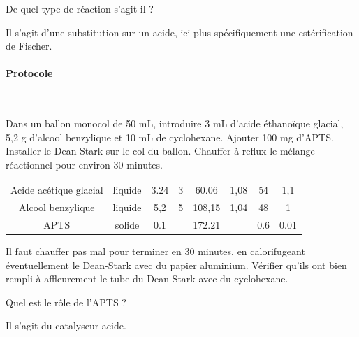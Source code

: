 \documentclass[twoside,a4paper,11pt,answers]{exam}
\begin{document}
\begin{questions}
\begin{framed}
\question De quel type de réaction s'agit-il ?
\begin{solution}[2cm]
Il s'agit d'une substitution sur un acide, ici plus spécifiquement une estérification de Fischer.
\end{solution}
\end{framed}


\paragraph*{Protocole}

~

Dans un ballon monocol de 50 mL, introduire 3 mL d’acide éthanoïque glacial, 5,2 g d’alcool benzylique et 10 mL de cyclohexane. Ajouter 100 mg d’APTS. Installer le Dean-Stark sur le col du ballon. Chauffer à reflux le mélange réactionnel pour environ 30 minutes.

\begin{solution}

\begin{tabular}{c|c|c|c|c|c|c|c}
\toprule
    \hline
     Acide acétique glacial  & liquide & 3.24 & 3 &	60.06	& 1,08	& 54	& 1,1 \\
Alcool benzylique & liquide	& 5,2	& 5	& 108,15	& 1,04 & 48 &	1 \\
APTS	& solide	& 0.1 &		& 172.21 & & 0.6 & 0.01 \\
 \bottomrule
\end{tabular}

    Il faut chauffer pas mal pour terminer en 30 minutes, en calorifugeant éventuellement le Dean-Stark avec du papier aluminium.
    Vérifier qu'ils ont bien rempli à affleurement le tube du Dean-Stark avec du cyclohexane.
\end{solution}

\begin{framed}
\question Quel est le rôle de l'APTS ?
\begin{solution}[1cm]
Il s'agit du catalyseur acide.
\end{solution}
\end{framed}


\end{questions}
\end{document}
